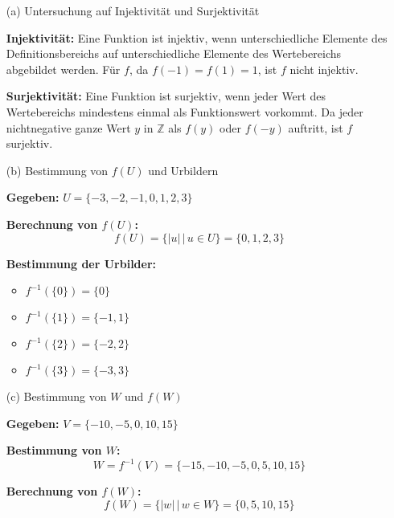 \begin{itemize}
    \item[(a)] Untersuchung auf Injektivität und Surjektivität
    
    \textbf{Injektivität:}
    Eine Funktion ist injektiv, wenn unterschiedliche Elemente des Definitionsbereichs auf unterschiedliche Elemente des Wertebereichs abgebildet werden. Für \( f \), da \( f(-1) = f(1) = 1 \), ist \( f \) nicht injektiv.
    
    \textbf{Surjektivität:}
    Eine Funktion ist surjektiv, wenn jeder Wert des Wertebereichs mindestens einmal als Funktionswert vorkommt. Da jeder nichtnegative ganze Wert \( y \) in \( \mathbb{Z} \) als \( f(y) \) oder \( f(-y) \) auftritt, ist \( f \) surjektiv.

    \item[(b)] Bestimmung von \( f(U) \) und Urbildern
    
    \textbf{Gegeben:} \( U = \{-3, -2, -1, 0, 1, 2, 3\} \)
    
    \textbf{Berechnung von \( f(U) \):}
    \[
    f(U) = \{ |u| \,|\, u \in U \} = \{0, 1, 2, 3\}
    \]
    
    \textbf{Bestimmung der Urbilder:}
    \begin{itemize}
        \item \( f^{-1}(\{0\}) = \{0\} \)
        \item \( f^{-1}(\{1\}) = \{-1, 1\} \)
        \item \( f^{-1}(\{2\}) = \{-2, 2\} \)
        \item \( f^{-1}(\{3\}) = \{-3, 3\} \)
    \end{itemize}

    \item[(c)]Bestimmung von \( W \) und \( f(W) \)
    
    \textbf{Gegeben:} \( V = \{-10, -5, 0, 10, 15\} \)
    
    \textbf{Bestimmung von \( W \):}
    \[
    W = f^{-1}(V) = \{-15, -10, -5, 0, 5, 10, 15\}
    \]
    
    \textbf{Berechnung von \( f(W) \):}
    \[
    f(W) = \{ |w| \,|\, w \in W \} = \{0, 5, 10, 15\}
    \]
\end{itemize}
